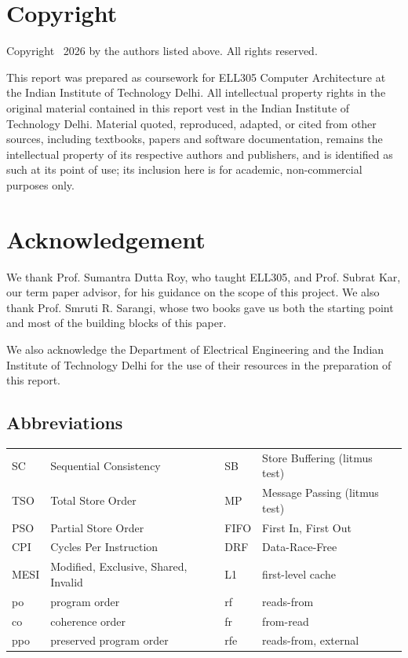 \chapter*{Copyright}
Copyright \textcopyright\ 2026 by the authors listed above. All rights reserved.

This report was prepared as coursework for ELL305 Computer Architecture at the Indian Institute of Technology Delhi. All intellectual property rights in the original material contained in this report vest in the Indian Institute of Technology Delhi. Material quoted, reproduced, adapted, or cited from other sources, including textbooks, papers and software documentation, remains the intellectual property of its respective authors and publishers, and is identified as such at its point of use; its inclusion here is for academic, non-commercial purposes only.

\chapter*{Acknowledgement}
We thank Prof. Sumantra Dutta Roy, who taught ELL305, and Prof. Subrat Kar, our term paper advisor, for his guidance on the scope of this project. We also thank Prof. Smruti R. Sarangi, whose two books gave us both the starting point and most of the building blocks of this paper.

We also acknowledge the Department of Electrical Engineering and the Indian Institute of Technology Delhi for the use of their resources in the preparation of this report.


\section*{Abbreviations}
\begin{center}
\small
\begin{tabular}{@{}ll@{\hspace{1.2cm}}ll@{}}
SC & Sequential Consistency & SB & Store Buffering (litmus test)\\
TSO & Total Store Order & MP & Message Passing (litmus test)\\
PSO & Partial Store Order & FIFO & First In, First Out\\
CPI & Cycles Per Instruction & DRF & Data-Race-Free\\
MESI & Modified, Exclusive, Shared, Invalid & L1 & first-level cache\\
po & program order & rf & reads-from\\
co & coherence order & fr & from-read\\
ppo & preserved program order & rfe & reads-from, external\\
\end{tabular}
\end{center}

